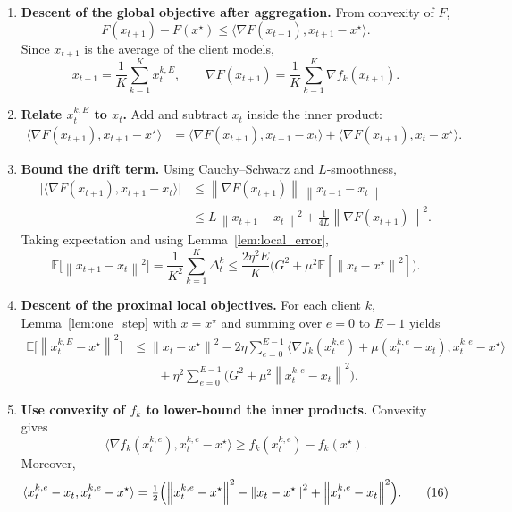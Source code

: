 \documentclass[11pt]{article}
\newcommand{\E}{\mathbb{E}}
\newcommand{\norm}[1]{\left\|#1\right\|}
\newcommand{\inner}[2]{\langle #1,#2\rangle}
\begin{document}
\begin{enumerate}
\item[Step 1.] \textbf{Descent of the global objective after aggregation.}  
From convexity of $F$,
\[
    F(x_{t+1})-F(x^{\star})\le
    \inner{\nabla F(x_{t+1})}{x_{t+1}-x^{\star}}.
\tag{9}
\]
Since $x_{t+1}$ is the average of the client models,
\[
    x_{t+1}= \frac1K\sum_{k=1}^{K}x_{t}^{k,E},
\qquad
    \nabla F(x_{t+1})=\frac1K\sum_{k=1}^{K}\nabla f_k(x_{t+1}).
\tag{10}
\]

\item[Step 2.] \textbf{Relate $x_{t}^{k,E}$ to $x_t$.}  
Add and subtract $x_t$ inside the inner product:
\[
\begin{aligned}
    \inner{\nabla F(x_{t+1})}{x_{t+1}-x^{\star}}
    &=\inner{\nabla F(x_{t+1})}{x_{t+1}-x_t}
      +\inner{\nabla F(x_{t+1})}{x_t-x^{\star}}.
\end{aligned}
\tag{11}
\]

\item[Step 3.] \textbf{Bound the drift term.}  
Using Cauchy–Schwarz and $L$‑smoothness,
\[
\begin{aligned}
    \bigl|\inner{\nabla F(x_{t+1})}{x_{t+1}-x_t}\bigr|
    &\le \norm{\nabla F(x_{t+1})}\,\norm{x_{t+1}-x_t}\\
    &\le L\,\norm{x_{t+1}-x_t}^{2} + \frac{1}{4L}\norm{\nabla F(x_{t+1})}^{2}.
\end{aligned}
\tag{12}
\]
Taking expectation and using Lemma~\ref{lem:local_error},
\[
    \E\!\bigl[\norm{x_{t+1}-x_t}^{2}\bigr]
    =\frac1{K^{2}}\sum_{k=1}^{K}\Delta_{t}^{k}
    \le \frac{2\eta^{2}E}{K}\bigl(G^{2}+\mu^{2}\E[\norm{x_t-x^{\star}}^{2}]\bigr).
\tag{13}
\]

\item[Step 4.] \textbf{Descent of the proximal local objectives.}  
For each client $k$, Lemma~\ref{lem:one_step} with $x=x^{\star}$ and summing over $e=0$ to $E-1$ yields
\[
\begin{aligned}
    \E\!\bigl[\norm{x_{t}^{k,E}-x^{\star}}^{2}\bigr]
    &\le \norm{x_t-x^{\star}}^{2}
    -2\eta\sum_{e=0}^{E-1}\inner{\nabla f_k(x_{t}^{k,e})+\mu(x_{t}^{k,e}-x_t)}{x_{t}^{k,e}-x^{\star}}\\
    &\qquad +\eta^{2}\sum_{e=0}^{E-1}\bigl(G^{2}+\mu^{2}\norm{x_{t}^{k,e}-x_t}^{2}\bigr).
\end{aligned}
\tag{14}
\]

\item[Step 5.] \textbf{Use convexity of $f_k$ to lower‑bound the inner products.}  
Convexity gives
\[
    \inner{\nabla f_k(x_{t}^{k,e})}{x_{t}^{k,e}-x^{\star}}
    \ge f_k(x_{t}^{k,e})-f_k(x^{\star}).
\tag{15}
\]
Moreover,
\[
    \inner{x_{t}^{k,e}-x_t}{x_{t}^{k,e}-x^{\star}}
    =\tfrac12\Bigl(\norm{x_{t}^{k,e}-x^{\star}}^{2}
                 -\norm{x_t-x^{\star}}^{2}
                 +\norm{x_{t}^{k,e}-x_t}^{2}\Bigr).
\tag{16}
\]


\end{enumerate}
\end{document}
